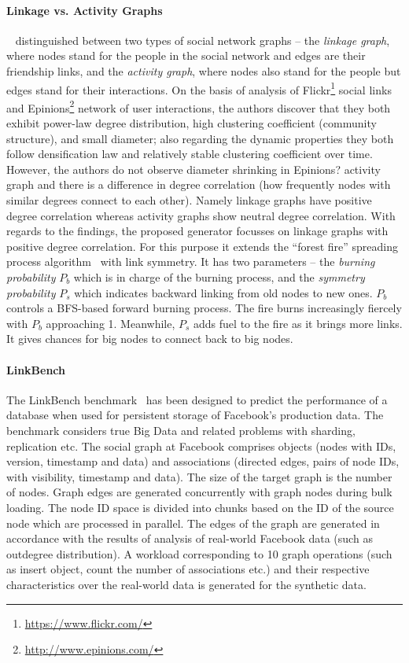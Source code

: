 \paragraph{Linkage vs. Activity Graphs} ~\cite{Yao2011} distinguished between two
types of social network graphs -- the \emph{linkage graph}, where nodes stand
for the people in the social network and edges are their friendship links, and
the \emph{activity graph}, where nodes also stand for the people but edges stand
for their interactions. On the basis of analysis of
Flickr\footnote{\url{https://www.flickr.com/}} social links and
Epinions\footnote{\url{http://www.epinions.com/}} network of user interactions,
the authors discover that they both exhibit power-law degree distribution, high
clustering coefficient (community structure), and small diameter; also regarding
the dynamic properties they both follow densification law and relatively stable
clustering coefficient over time. However, the authors do not observe diameter
shrinking in Epinions? activity graph and there is a difference in degree
correlation (how frequently nodes with similar degrees connect to each other).
Namely linkage graphs have positive degree correlation whereas activity graphs
show neutral degree correlation. With regards to the findings, the proposed generator focusses on linkage graphs
with positive degree correlation. For this purpose it extends the ``forest
fire'' spreading process algorithm~\cite{Leskovec:2005:GOT:1081870.1081893} with
link symmetry. It has two parameters -- the \emph{burning probability} $P_b$
which is in charge of the burning process, and the \emph{symmetry probability}
$P_s$ which indicates backward linking from old nodes to new ones. $P_b$
controls a BFS-based forward burning process. The fire burns increasingly
fiercely with $P_b$ approaching 1. Meanwhile, $P_s$ adds fuel to the fire as it
brings more links. It gives chances for big nodes to connect back to big nodes.


\paragraph{LinkBench} The LinkBench
benchmark~\cite{Armstrong:2013:LDB:2463676.2465296} has been designed to predict the
performance of a database when used for persistent storage of Facebook's
production data. The benchmark considers true Big Data and related problems with
sharding, replication etc. The social graph at Facebook comprises objects (nodes
with IDs, version, timestamp and data) and associations (directed edges, pairs
of node IDs, with visibility, timestamp and data). The size of the target graph
is the number of nodes. Graph edges are generated concurrently with graph nodes
during bulk loading. The node ID space is divided into chunks based on the ID of
the source node which  are processed in parallel. The edges of the graph are
generated in accordance with the results of analysis of real-world Facebook data
(such as outdegree distribution). A workload corresponding to 10 graph
operations (such as insert object, count the number of associations etc.) and
their respective characteristics over the real-world data is generated for the
synthetic data.

